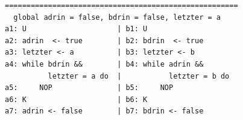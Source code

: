 \documentclass[a4paper,twoside,12pt]{article}
\begin{document}
\begin{description}
\begin{enumerate}
\begin{verbatim}
======================================================
  global adrin = false, bdrin = false, letzter = a
a1: U                     | b1: U
a2: adrin  <- true        | b2: bdrin  <- true
a3: letzter <- a          | b3: letzter <- b
a4: while bdrin &&        | b4: while adrin &&
          letzter = a do  |           letzter = b do
a5:     NOP               | b5:     NOP
a6: K                     | b6: K
a7: adrin <- false        | b7: bdrin <- false
\end{verbatim}
\end{enumerate}

\end{description}
\end{document}
